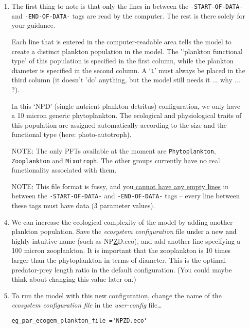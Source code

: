 \documentclass[11pt,fleqn]{book} %
\begin{document}
\begin{enumerate}[noitemsep]
\vspace{1mm}
\item The first thing to note is that only the lines in between the \texttt{\small -START-OF-DATA-} and \texttt{\small -END-OF-DATA-} tags are read by the computer. The rest is there solely for your guidance. 

Each line that is entered in the computer-readable area tells the model to create a distinct plankton population in the model. The '`plankton functional type' of this population is specified in the first column, while the plankton diameter is specified in the second column. A `\texttt{1}' must always be placed in the third column (it doesn't 'do' anything, but the model still needs it ...  why ... ?).

In this `NPD' (single nutrient-plankton-detritus) configuration, we only have a 10 micron generic phytoplankton. The ecological and physiological traits of this population are assigned automatically according to the size and the functional type (here: photo-autotroph). 

\item[NOTE:] The only PFTs available at the moment are \texttt{Phytoplankton}, \texttt{Zooplankton} and \texttt{Mixotroph}. The other groups currently have no real functionality associated with them. 

\item[NOTE:] This file format is fussy, and you\uline{ cannot have any empty lines} in between the  \texttt{\small -START-OF-DATA-} and \texttt{\small -END-OF-DATA-} tags -- every line between these tags must have data (3 parameter values).

\vspace{1mm}
\item We can increase the ecological complexity of the model by adding another plankton population. Save the \textit{ecosystem configuration} file under a new and highly intuitive name (such as \textsf{\footnotesize NP\underline{Z}D.eco}), and add another line specifying a 100 micron zooplankton. It is important that the zooplankton is 10 times larger than the phytoplankton in terms of diameter. This is the optimal predator-prey length ratio in the default configuration. (You could maybe think about changing this value later on.)

\vspace{1mm}
\item  To run the model with this new configuration, change the name of the \textit{ecosystem configuration file} in the \textit{user-config} file\dots
\small\begin{verbatim}
eg_par_ecogem_plankton_file ='NPZD.eco'
\end{verbatim}\normalsize


\end{enumerate}
\end{document}
